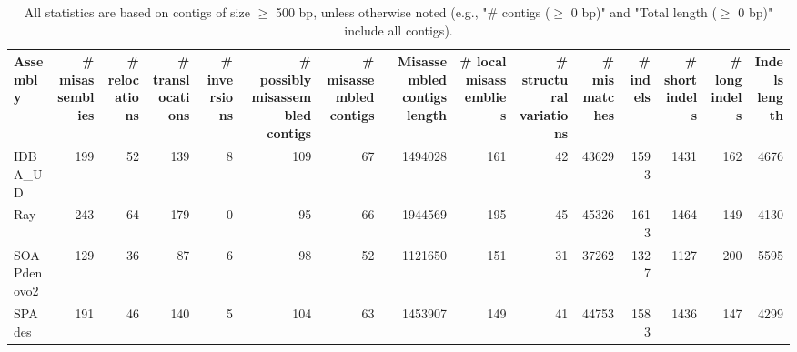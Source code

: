 \documentclass[12pt,a4paper]{article}
\begin{document}
\begin{table}[ht]
\begin{center}
\caption{All statistics are based on contigs of size $\geq$ 500 bp, unless otherwise noted (e.g., "\# contigs ($\geq$ 0 bp)" and "Total length ($\geq$ 0 bp)" include all contigs).}
\begin{tabular}{|l*{14}{|r}|}
\hline
Assembly & \# misassemblies &     \# relocations &     \# translocations &     \# inversions & \# possibly misassembled contigs & \# misassembled contigs & Misassembled contigs length & \# local misassemblies & \# structural variations & \# mismatches & \# indels &     \# short indels &     \# long indels & Indels length \\ \hline
IDBA\_UD & 199 & 52 & 139 & 8 & 109 & 67 & 1494028 & 161 & 42 & 43629 & 1593 & 1431 & 162 & 4676 \\ \hline
Ray & 243 & 64 & 179 & 0 & 95 & 66 & 1944569 & 195 & 45 & 45326 & 1613 & 1464 & 149 & 4130 \\ \hline
SOAPdenovo2 & 129 & 36 & 87 & 6 & 98 & 52 & 1121650 & 151 & 31 & 37262 & 1327 & 1127 & 200 & 5595 \\ \hline
SPAdes & 191 & 46 & 140 & 5 & 104 & 63 & 1453907 & 149 & 41 & 44753 & 1583 & 1436 & 147 & 4299 \\ \hline
\end{tabular}
\end{center}
\end{table}
\end{document}
